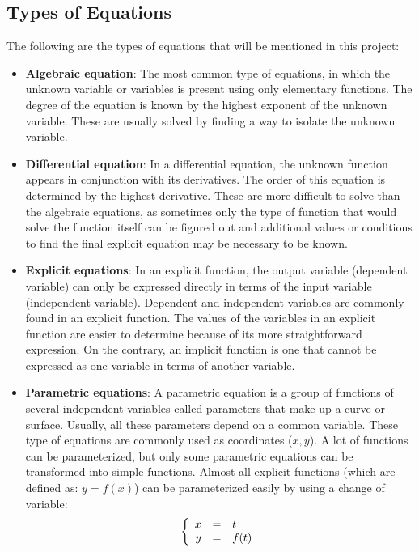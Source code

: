 \documentclass[12pt,twoside,a4paper]{article}
\begin{document}
	\newpage
	
	\subsection*{Types of Equations}
	The following are the types of equations that will be mentioned in this project:
	\begin{itemize}
		\item \textbf{Algebraic equation}: The most common type of equations, in which the unknown variable or variables is present using only elementary functions. The degree of the equation is known by the highest exponent of the unknown variable. These are usually solved by finding a way to isolate the unknown variable.
		
		\item \textbf{Differential equation}: In a differential equation, the unknown function appears in conjunction with its derivatives. The order of this equation is determined by the highest derivative. These are more difficult to solve than the algebraic equations, as sometimes only the type of function that would solve the function itself can be figured out and additional values or conditions to find the final explicit equation may be necessary to be known.
		
		\item \textbf{Explicit equations}: In an explicit function, the output variable (dependent variable) can only be expressed directly in terms of the input variable (independent variable). Dependent and independent variables are commonly found in an explicit function. The values of the variables in an explicit function are easier to determine because of its more straightforward expression. On the contrary, an implicit function is one that cannot be expressed as one variable in terms of another variable.
		
		\item \textbf{Parametric equations}: A parametric equation is a group of functions of several independent variables called parameters that make up a curve or surface. Usually, all these parameters depend on a common variable. These type of equations are commonly used as coordinates ($x, y$). A lot of functions can be parameterized, but only some parametric equations can be transformed into simple functions. Almost all explicit functions (which are defined as: $y = f(x)$) can be parameterized easily by using a change of variable:
			$$\left\{\begin{array}{rcl} x &=& t \cr y &=& f(t) \end{array}\right.$$
		

\end{itemize}
\end{document}
